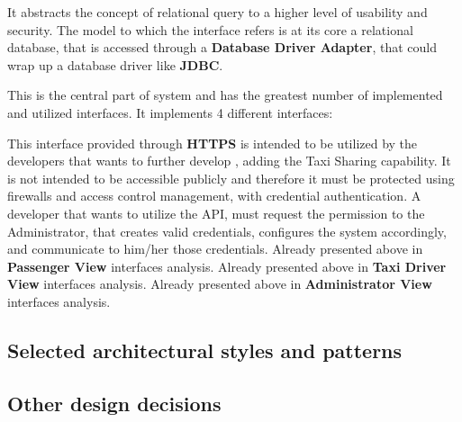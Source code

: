 \begin{itemize}
\begin{itemize}
		It abstracts the concept of relational query to a higher level of usability and security.
		The model to which the interface refers is at its core a relational database, that is accessed through a \textbf{Database Driver Adapter}, that could wrap up a database driver like \textbf{JDBC}.
	\end{itemize}
	This is the central part of \myTaxiService{} system and has the greatest number of implemented and utilized interfaces.
	It implements 4 different interfaces:
	\begin{itemize}
		 This interface provided through \textbf{HTTPS} is intended to be utilized by the developers that wants to further develop \myTaxiService{}, adding the Taxi Sharing capability.
		It is not intended to be accessible publicly and therefore it must be protected using firewalls and access control management, with credential authentication.
		A developer that wants to utilize the API, must request the permission to the Administrator, that creates valid credentials, configures the system accordingly, and communicate to him/her those credentials.
		 Already presented above in \textbf{Passenger View} interfaces analysis.
		 Already presented above in \textbf{Taxi Driver View} interfaces analysis.
		 Already presented above in \textbf{Administrator View} interfaces analysis.
	\end{itemize}
\end{itemize}
\subsection{Selected architectural styles and patterns}
\subsection{Other design decisions}